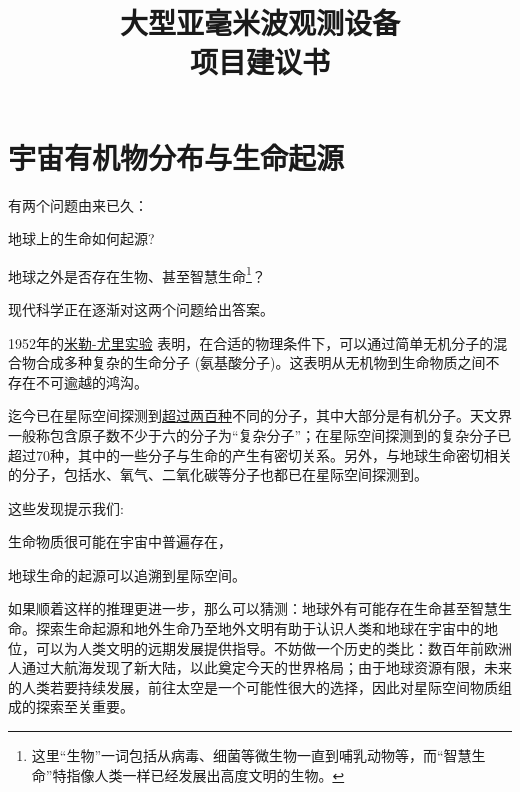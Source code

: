 \documentclass{report}
\title{大型亚毫米波观测设备\\%
项目建议书}
\author{}
\begin{document}
\maketitle

\chapter{宇宙有机物分布与生命起源}


有两个问题由来已久：
\begin{enumerate*}[label=\arabic*)]
  \item 地球上的生命如何起源?
  \item 地球之外是否存在生物、甚至智慧生命\footnote{这里“生物”一词包括从病毒、细菌等微生物一直到哺乳动物等，而“智慧生命”特指像人类一样已经发展出高度文明的生物。}？
\end{enumerate*}  
现代科学正在逐渐对这两个问题给出答案。

1952年的\href{https://en.wikipedia.org/wiki/Miller%E2%80%93Urey_experiment}{米勒-尤里实验}%
表明，在合适的物理条件下，可以通过简单无机分子的混合物合成多种复杂的生命分子 (氨基酸分子)。这表明从无机物到生命物质之间不存在不可逾越的鸿沟。

迄今已在星际空间探测到\href{http://www.astro.uni-koeln.de/cdms/molecules}{超过两百种}不同的分子，其中大部分是有机分子。天文界一般称包含原子数不少于六的分子为“复杂分子”；在星际空间探测到的复杂分子已超过70种，其中的一些分子与生命的产生有密切关系。另外，与地球生命密切相关的分子，包括水、氧气、二氧化碳等分子也都已在星际空间探测到。

这些发现提示我们: \begin{enumerate*}[label=\arabic*)]\item 生命物质很可能在宇宙中普遍存在，\item 地球生命的起源可以追溯到星际空间。\end{enumerate*} 如果顺着这样的推理更进一步，那么可以猜测：地球外有可能存在生命甚至智慧生命。探索生命起源和地外生命乃至地外文明有助于认识人类和地球在宇宙中的地位，可以为人类文明的远期发展提供指导。不妨做一个历史的类比：数百年前欧洲人通过大航海发现了新大陆，以此奠定今天的世界格局；由于地球资源有限，未来的人类若要持续发展，前往太空是一个可能性很大的选择，因此对星际空间物质组成的探索至关重要。
\end{document}
